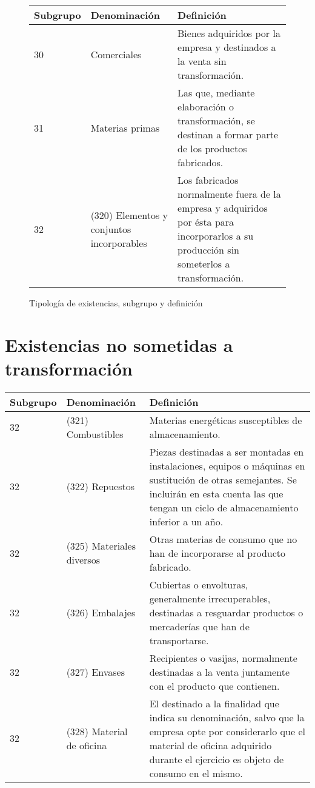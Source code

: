 \documentclass{article}
\begin{document}
\begin{figure}[h]
    \centering
    \begin{tabular}{|m{2cm}|m{3cm}|m{6cm}|}
        \hline
        \textbf{Subgrupo} & \textbf{Denominación} & \textbf{Definición} \\
        \hline
        30 & Comerciales & Bienes adquiridos por la empresa y destinados a la venta sin transformación. \\
        \hline
        31 & Materias primas & Las que, mediante elaboración o transformación, se destinan a formar parte de los productos fabricados. \\
        \hline
        32 & (320) Elementos y conjuntos incorporables & Los fabricados normalmente fuera de la empresa y adquiridos por ésta para incorporarlos a su producción sin someterlos a transformación. \\
        \hline
    \end{tabular}
    \caption{Tipología de existencias, subgrupo y definición}
\end{figure}

\section*{Existencias no sometidas a transformación}

\begin{tabular}{|p{4cm}|p{4cm}|p{6cm}|}
\hline
\textbf{Subgrupo} & \textbf{Denominación} & \textbf{Definición} \\
\hline
32 & (321) Combustibles & Materias energéticas susceptibles de almacenamiento. \\
\hline
32 & (322) Repuestos & Piezas destinadas a ser montadas en instalaciones, equipos o máquinas en sustitución de otras semejantes. Se incluirán en esta cuenta las que tengan un ciclo de almacenamiento inferior a un año. \\
\hline
32 & (325) Materiales diversos & Otras materias de consumo que no han de incorporarse al producto fabricado. \\
\hline
32 & (326) Embalajes & Cubiertas o envolturas, generalmente irrecuperables, destinadas a resguardar productos o mercaderías que han de transportarse. \\
\hline
32 & (327) Envases & Recipientes o vasijas, normalmente destinadas a la venta juntamente con el producto que contienen. \\
\hline
32 & (328) Material de oficina & El destinado a la finalidad que indica su denominación, salvo que la empresa opte por considerarlo que el material de oficina adquirido durante el ejercicio es objeto de consumo en el mismo. \\
\hline
\end{tabular}
\end{document}
